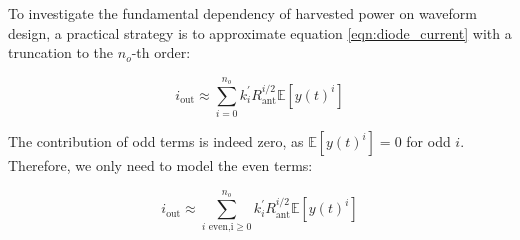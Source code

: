 To investigate the fundamental dependency of harvested power on waveform design, a practical strategy is to approximate equation \ref{eqn:diode_current} with a truncation to the ${n_o}$-th order:

\begin{equation}\label{eqn:output_current_truncation}
  {i_{{\text{out}}}} \approx \sum\limits_{i = 0}^{{n_o}} {k_i^\prime } R_{{\text{ant}}}^{i/2}\mathbb{E}\left[ {y{{(t)}^i}} \right]
\end{equation}

The contribution of odd terms is indeed zero, as $\mathbb{E}\left[ {y{{(t)}^i}} \right] = 0$ for odd $i$. Therefore, we only need to model the even terms:

\begin{equation}\label{eqn:output_current}
  {i_{{\text{out}}}} \approx \sum\limits_{i{\text{ even,i}} \geqslant 0}^{{n_o}} {k_i^\prime } R_{{\text{ant}}}^{i/2}\mathbb{E}\left[ {y{{(t)}^i}} \right]
\end{equation}

